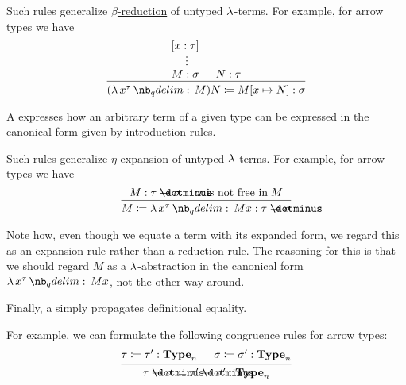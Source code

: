\begin{remark}
\begin{thmenum}
\begin{thmenum}
      Such rules generalize \hyperref[def:beta_eta_reduction]{\( \beta \)-reduction} of untyped \( \mathrm{\lambda} \)-terms. For example, for arrow types we have
      \begin{equation*}
        \begin{prooftree}
          \hypo{ [x: \tau] }
          \ellipsis {} { M: \sigma }

          \hypo{ N: \tau }
          \infer2{ (\qabs {x^\tau} M) N \coloneqq M[x \mapsto N]: \sigma }.
        \end{prooftree}
      \end{equation*}

       A  expresses how an arbitrary term of a given type can be expressed in the canonical form given by introduction rules.

      Such rules generalize \hyperref[def:beta_eta_reduction]{\( \eta \)-expansion} of untyped \( \mathrm{\lambda} \)-terms. For example, for arrow types we have
      \begin{equation*}
        \begin{prooftree}
          \hypo{ M: \tau \synimplies \sigma }
          \hypo{ x \T{is not free in} M }
          \infer2{ M \coloneqq \qabs {x^\tau} M x: \tau \synimplies \sigma }.
        \end{prooftree}
      \end{equation*}

      Note how, even though we equate a term with its expanded form, we regard this as an expansion rule rather than a reduction rule. The reasoning for this is that we should regard \( M \) as a \( \mathrm{\lambda} \)-abstraction in the canonical form \( \qabs {x^\tau} M x \), not the other way around.

       Finally, a  simply propagates definitional equality.

      For example, we can formulate the following congruence rules for arrow types:
      \begin{equation*}
        \begin{prooftree}
          \hypo{ \tau \coloneqq \tau': \op*{Type}_n }
          \hypo{ \sigma \coloneqq \sigma': \op*{Type}_n }
          \infer2{ \tau \synimplies \sigma \coloneqq \tau' \synimplies \sigma': \op*{Type}_n }
        \end{prooftree}
      \end{equation*}


\end{thmenum}
\end{thmenum}
\end{remark}
